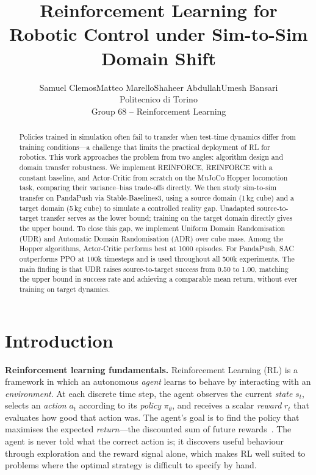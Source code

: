 \documentclass[10pt,twocolumn,letterpaper]{article}
\title{Reinforcement Learning for Robotic Control under Sim-to-Sim Domain Shift}
\author{Samuel Clemos\qquad Matteo Marello\qquad Shaheer Abdullah\qquad Umesh Bansari\\
Politecnico di Torino\\
Group 68 -- Reinforcement Learning}
\date{}
\begin{document}
\maketitle

\begin{abstract}
Policies trained in simulation often fail to transfer when test-time dynamics differ from training conditions---a challenge that limits the practical deployment of RL for robotics. This work approaches the problem from two angles: algorithm design and domain transfer robustness. We implement REINFORCE, REINFORCE with a constant baseline, and Actor-Critic from scratch on the MuJoCo Hopper locomotion task, comparing their variance--bias trade-offs directly. We then study sim-to-sim transfer on PandaPush via Stable-Baselines3, using a source domain (1\,kg cube) and a target domain (5\,kg cube) to simulate a controlled reality gap. Unadapted source-to-target transfer serves as the lower bound; training on the target domain directly gives the upper bound. To close this gap, we implement Uniform Domain Randomisation (UDR) and Automatic Domain Randomisation (ADR) over cube mass. Among the Hopper algorithms, Actor-Critic performs best at 1000 episodes. For PandaPush, SAC outperforms PPO at 100k timesteps and is used throughout all 500k experiments. The main finding is that UDR raises source-to-target success from 0.50 to 1.00, matching the upper bound in success rate and achieving a comparable mean return, without ever training on target dynamics.
\end{abstract}

\section{Introduction}

\textbf{Reinforcement learning fundamentals.}
Reinforcement Learning (RL) is a framework in which an autonomous \emph{agent} learns to behave by interacting with an \emph{environment}. At each discrete time step, the agent observes the current \emph{state} $s_t$, selects an \emph{action} $a_t$ according to its \emph{policy} $\pi_\theta$, and receives a scalar \emph{reward} $r_t$ that evaluates how good that action was. The agent's goal is to find the policy that maximises the expected \emph{return}---the discounted sum of future rewards~\cite{sutton2018reinforcement}. The agent is never told what the correct action is; it discovers useful behaviour through exploration and the reward signal alone, which makes RL well suited to problems where the optimal strategy is difficult to specify by hand.
\end{document}
